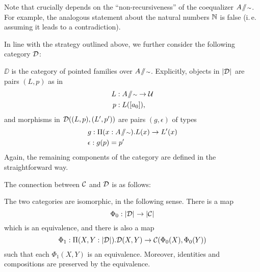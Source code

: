 \begin{remark}
Note that  crucially depends on the ``non-recur\-siveness''
of the coequalizer $A \! \sslash \! {\scriptstyle \sim}$.
For example, the analogous statement about the natural numbers $\mathbb{N}$ is false
(i.\,e. assuming it leads to a contradiction).
\end{remark}

In line with the strategy outlined above, we further consider the following
category $\mathcal D$:
\begin{defn}\label{def:paths-catD}
 $\DD$ is the category of pointed families over $A \! \sslash \! {\scriptstyle \sim}$.
 Explicitly, objects in $\mathopen{}\left|\mathcal D\right|_{}^{}\mathclose{}$ are pairs $(L,p)$ as in
 \begin{align*}
  L &: A \! \sslash \! {\scriptstyle \sim} \to \mathcal{U} \\
  p &: L([a_0]),
 \end{align*}
 and morphisms in $\mathcal D((L,p), (L',p'))$ are pairs $(g,\epsilon)$ of types 
 \begin{align}
  & g : \Pi(x : A \! \sslash \! {\scriptstyle \sim}). L(x) \to L'(x) \label{eq:D0-morph-g}  \\
  & \epsilon : g(p) = p' \label{eq:D0-morph-e}
 \end{align}
 Again, the remaining components of the category are defined in the straightforward way.
\end{defn}

The connection between $\mathcal C$ and $\mathcal D$ is as follows:
\begin{lemma} \label{lem:paths-cats-are-iso}
 The two categories are isomorphic, in the following sense.
 There is a map
 \begin{equation} \label{eq:Phi0-folded}
  \Phi_0 : \mathopen{}\left|\mathcal D\right|_{}^{}\mathclose{} \to \mathopen{}\left|\mathcal C\right|_{}^{}\mathclose{}
 \end{equation}
 which is an equivalence, and there is also a map
 \begin{equation} \label{eq:Phi1-folded}
  \Phi_1 : \Pi (X,Y : \mathopen{}\left|\mathcal D\right|_{}^{}\mathclose{}). \mathcal D(X,Y) \to \mathcal C(\Phi_0(X),\Phi_0(Y))
 \end{equation}
 such that each $\Phi_1(X,Y)$ is an equivalence.
 Moreover, identities and compositions are preserved by the equivalence.
\end{lemma}

